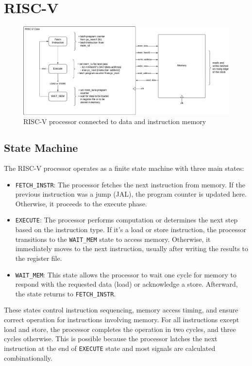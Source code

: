 \section{RISC-V}

\begin{figure}[H]
    \centering
    \includegraphics[width=\textwidth]{media/riscv}
    \caption{RISC-V processor connected to data and instruction memory}
    \label{fig:riscv}
\end{figure}

\subsection{State Machine}

The RISC-V processor operates as a finite state machine with three main states:
\begin{itemize}
\item
    \texttt{FETCH\_INSTR}:
        The processor fetches the next instruction from memory.
        If the previous instruction was a jump (JAL), the program counter is updated here.
        Otherwise, it proceeds to the execute phase.

\item
    \texttt{EXECUTE}:
        The processor performs computation or determines the next step based on the instruction type.
        If it’s a load or store instruction, the processor transitions to the \texttt{WAIT\_MEM} state to access memory.
        Otherwise, it immediately moves to the next instruction, usually after writing the results to the register file.

\item
    \texttt{WAIT\_MEM}:
        This state allows the processor to wait one cycle for memory to respond with the requested data (load) or acknowledge a store.
        Afterward, the state returns to \texttt{FETCH\_INSTR}.
\end{itemize}

These states control instruction sequencing, memory access timing, and ensure correct operation for instructions involving memory.
For all instructions except load and store, the processor completes the operation in two cycles, and three cycles otherwise.
This is possible because the processor latches the next instruction at the end of \texttt{EXECUTE} state and most signals are calculated combinationally.


